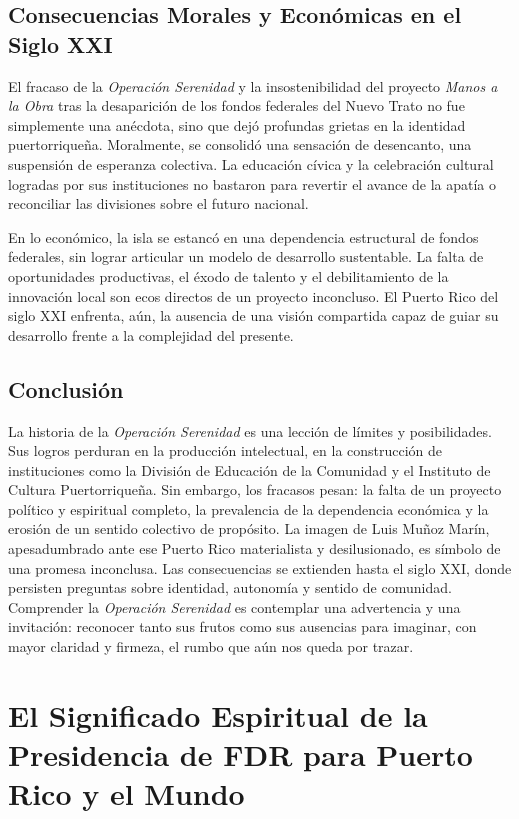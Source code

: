 \documentclass[
]{book}
\begin{document}
\section{Consecuencias Morales y Económicas en el Siglo XXI}\label{consecuencias-morales-y-econuxf3micas-en-el-siglo-xxi}

El fracaso de la \emph{Operación Serenidad} y la insostenibilidad del proyecto \emph{Manos a la Obra} tras la desaparición de los fondos federales del Nuevo Trato no fue simplemente una anécdota, sino que dejó profundas grietas en la identidad puertorriqueña. Moralmente, se consolidó una sensación de desencanto, una suspensión de esperanza colectiva. La educación cívica y la celebración cultural logradas por sus instituciones no bastaron para revertir el avance de la apatía o reconciliar las divisiones sobre el futuro nacional.

En lo económico, la isla se estancó en una dependencia estructural de fondos federales, sin lograr articular un modelo de desarrollo sustentable. La falta de oportunidades productivas, el éxodo de talento y el debilitamiento de la innovación local son ecos directos de un proyecto inconcluso. El Puerto Rico del siglo XXI enfrenta, aún, la ausencia de una visión compartida capaz de guiar su desarrollo frente a la complejidad del presente.

\section{Conclusión}\label{conclusiuxf3n-1}

La historia de la \emph{Operación Serenidad} es una lección de límites y posibilidades. Sus logros perduran en la producción intelectual, en la construcción de instituciones como la División de Educación de la Comunidad y el Instituto de Cultura Puertorriqueña. Sin embargo, los fracasos pesan: la falta de un proyecto político y espiritual completo, la prevalencia de la dependencia económica y la erosión de un sentido colectivo de propósito. La imagen de Luis Muñoz Marín, apesadumbrado ante ese Puerto Rico materialista y desilusionado, es símbolo de una promesa inconclusa. Las consecuencias se extienden hasta el siglo XXI, donde persisten preguntas sobre identidad, autonomía y sentido de comunidad. Comprender la \emph{Operación Serenidad} es contemplar una advertencia y una invitación: reconocer tanto sus frutos como sus ausencias para imaginar, con mayor claridad y firmeza, el rumbo que aún nos queda por trazar.

\chapter{El Significado Espiritual de la Presidencia de FDR para Puerto Rico y el Mundo}\label{el-significado-espiritual-de-la-presidencia-de-fdr-para-puerto-rico-y-el-mundo}
\end{document}
